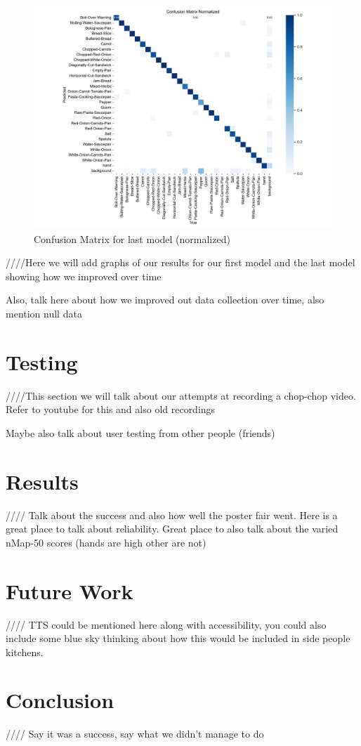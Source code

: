 \documentclass{article}
\begin{document}
\begin{figure}[htbp]
        \begin{minipage}[htbp]{1\linewidth}
            \centering
            \includegraphics[width=\linewidth]{assets/confusion_matrix_normalized-Version-6.png}
            \caption{Confusion Matrix for last model (normalized)}
        \end{minipage}
    \end{figure}
    
    ////Here we will add graphs of our results for our first model and the last model showing how we improved over time

    Also, talk here about how we improved out data collection over time, also mention null data


    \section{Testing}
    ////This section we will talk about our attempts at recording a chop-chop video. Refer to youtube for this and also old recordings

    Maybe also talk about user testing from other people (friends)

    \section{Results}
    //// Talk about the success and also how well the poster fair went. Here is a great place to talk about reliability. Great place to also talk about the varied nMap-50 scores (hands are high other are not)

    \section{Future Work}
    //// TTS could be mentioned here along with accessibility, you could also include some blue sky thinking about how this would be included in side people kitchens.


    \section{Conclusion}
    //// Say it was a success, say what we didn't manage to do

    \pagebreak

    
  

  
  
  
\end{document}
